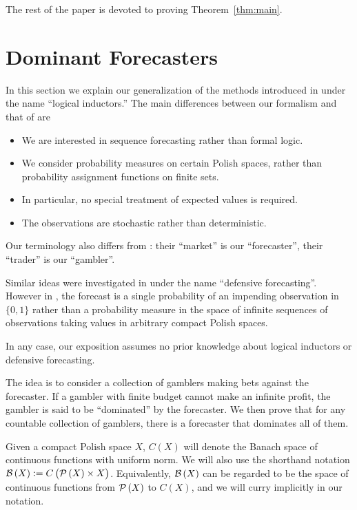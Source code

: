The rest of the paper is devoted to proving Theorem~\ref{thm:main}.

\section{Dominant Forecasters}
\label{sec:garrabrant}

In this section we explain our generalization of the methods introduced in \cite{Garrabrant_2016} under the name \enquote{logical inductors.} The main differences between our formalism and that of \cite{Garrabrant_2016} are

\begin{itemize}
\item 
We are interested in sequence forecasting rather than formal logic.
\item
We consider probability measures on certain Polish spaces, rather than probability assignment functions on finite sets.
\item
In particular, no special treatment of expected values is required.
\item
The observations are stochastic rather than deterministic.
\end{itemize}

Our terminology also differs from \cite{Garrabrant_2016}: their \enquote{market} is our \enquote{forecaster}, their \enquote{trader} is our \enquote{gambler}.

Similar ideas were investigated in \cite{Vovk_2005} under the name \enquote{defensive forecasting}. However in \cite{Vovk_2005}, the forecast is a single probability of an impending observation in $\{0,1\}$ rather than a probability measure in the space of infinite sequences of observations taking values in arbitrary compact Polish spaces.

In any case, our exposition assumes no prior knowledge about logical inductors or defensive forecasting.

The idea is to consider a collection of gamblers making bets against the forecaster. If a gambler with finite budget cannot make an infinite profit, the gambler is said to be \enquote{dominated} by the forecaster. We then prove that for any countable collection of gamblers, there is a forecaster that dominates all of them.

Given a compact Polish space $X$, $C\left(X\right)$ will denote the Banach space of continuous functions with uniform norm. We will also use the shorthand notation $\mathcal{B}\left(X\right):=C\left(\mathcal{P}\left(X\right) \times X\right)$. Equivalently, $\mathcal{B}\left(X\right)$ can be regarded to be the space of continuous functions from $\mathcal{P}\left(X\right)$ to $C\left(X\right)$, and we will curry implicitly in our notation.

